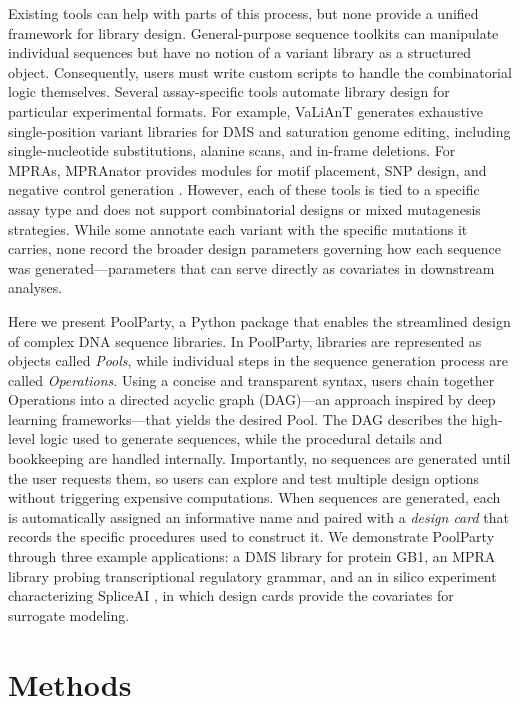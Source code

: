 \documentclass[twoside]{kinneylab_preprintstyle}
\begin{document}
Existing tools can help with parts of this process, but none provide a unified framework for library design. General-purpose sequence toolkits \citep{Cock2009df, Pereira2015wj, Klie2023kg} can manipulate individual sequences but have no notion of a variant library as a structured object. Consequently, users must write custom scripts to handle the combinatorial logic themselves. Several assay-specific tools automate library design for particular experimental formats. For example, VaLiAnT \citep{Barbon2022th} generates exhaustive single-position variant libraries for DMS and saturation genome editing, including single-nucleotide substitutions, alanine scans, and in-frame deletions. For MPRAs, MPRAnator \citep{GeorgakopoulosSoares2017gb} provides modules for motif placement, SNP design, and negative control generation \citep[see also][]{Ghazi2018aa}. However, each of these tools is tied to a specific assay type and does not support combinatorial designs or mixed mutagenesis strategies. While some annotate each variant with the specific mutations it carries, none record the broader design parameters governing how each sequence was generated---parameters that can serve directly as covariates in downstream analyses. 

Here we present PoolParty, a Python package that enables the streamlined design of complex DNA sequence libraries. In PoolParty, libraries are represented as objects called \emph{Pools}, while individual steps in the sequence generation process are called \emph{Operations}. Using a concise and transparent syntax, users chain together Operations into a directed acyclic graph (DAG)---an approach inspired by deep learning frameworks---that yields the desired Pool. The DAG describes the high-level logic used to generate sequences, while the procedural details and bookkeeping are handled internally. Importantly, no sequences are generated until the user requests them, so users can explore and test multiple design options without triggering expensive computations. When sequences are generated, each is automatically assigned an informative name and paired with a \emph{design card} that records the specific procedures used to construct it. We demonstrate PoolParty through three example applications: a DMS library for protein GB1, an MPRA library probing transcriptional regulatory grammar, and an in silico experiment characterizing SpliceAI \citep{Jaganathan2019ps}, in which design cards provide the covariates for surrogate modeling.

\section*{Methods}
\end{document}
